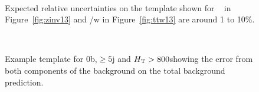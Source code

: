 \begin{figure}[h!]
  \centering
  ~~
  \\
  \caption{\label{fig:expected13}
  Expected relative uncertainties on the template shown for \zInv~ in Figure~\ref{fig:zinv13} 
  and \ttbar/w in Figure~\ref{fig:ttw13} are around 1 to 10\%.}
  
\end{figure}

\begin{figure}[h!]
  \centering
  \\
  \caption{\label{fig:exampleTemplate13}
  Example template for 0b,$\ge5$j and $\mbox{$H_\text{T}$} > 800$\GeV showing the error from both
components of the background on the total background prediction.}
  
\end{figure}

